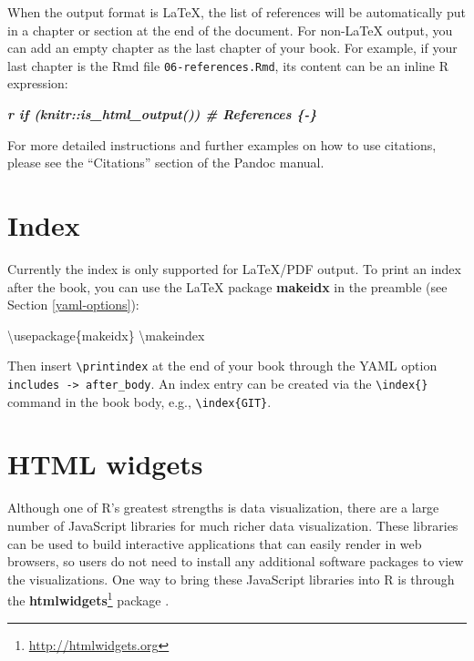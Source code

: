 \documentclass[
  12pt,
]{krantz}
\newenvironment{Shaded}{\begin{snugshade}}{\end{snugshade}}
\newcommand{\BuiltInTok}[1]{#1}
\newcommand{\ExtensionTok}[1]{#1}
\newcommand{\FunctionTok}[1]{\textcolor[rgb]{0.00,0.00,0.00}{#1}}
\newcommand{\InformationTok}[1]{\textcolor[rgb]{0.56,0.35,0.01}{\textbf{\textit{#1}}}}
\newcommand{\NormalTok}[1]{#1}
\renewcommand{\href}[2]{#2\footnote{\url{#1}}}
\theoremstyle{definition}
\theoremstyle{definition}
\theoremstyle{definition}
\theoremstyle{definition}
\theoremstyle{remark}
\begin{document}
When the output format is LaTeX, the list of references will be automatically put in a chapter or section at the end of the document. For non-LaTeX output, you can add an empty chapter as the last chapter of your book. For example, if your last chapter is the Rmd file \texttt{06-references.Rmd}, its content can be an inline R expression:

\begin{Shaded}
\begin{Highlighting}[]
\InformationTok{\textasciigrave{}r if (knitr::is\_html\_output()) \textquotesingle{}\# References \{{-}\}\textquotesingle{}\textasciigrave{}}
\end{Highlighting}
\end{Shaded}

For more detailed instructions and further examples on how to use citations, please see the ``Citations'' section of the Pandoc manual.

\hypertarget{latex-index}{%
\section{Index}\label{latex-index}}

Currently the index is only supported for LaTeX/PDF output. To print an index after the book, you can use the LaTeX package \textbf{makeidx} in the preamble (see Section \ref{yaml-options}):

\begin{Shaded}
\begin{Highlighting}[]
\BuiltInTok{\textbackslash{}usepackage}\NormalTok{\{}\ExtensionTok{makeidx}\NormalTok{\}}
\FunctionTok{\textbackslash{}makeindex}
\end{Highlighting}
\end{Shaded}

Then insert \texttt{\textbackslash{}printindex} at the end of your book through the YAML option \texttt{includes\ -\textgreater{}\ after\_body}. An index entry can be created via the \texttt{\textbackslash{}index\{\}} command in the book body, e.g., \texttt{\textbackslash{}index\{GIT\}}.

\hypertarget{html-widgets}{%
\section{HTML widgets}\label{html-widgets}}

Although one of R's greatest strengths is data visualization, there are a large number of JavaScript libraries for much richer data visualization. These libraries can be used to build interactive applications that can easily render in web browsers, so users do not need to install any additional software packages to view the visualizations. One way to bring these JavaScript libraries into R is through the \href{http://htmlwidgets.org}{\textbf{htmlwidgets}} package \citep{R-htmlwidgets}.
\end{document}

